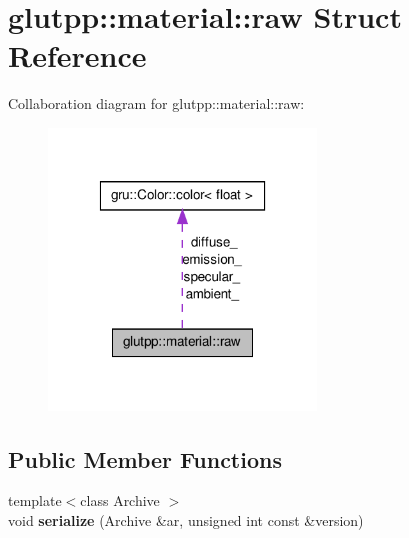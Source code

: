 \hypertarget{structglutpp_1_1material_1_1raw}{\section{glutpp\-:\-:material\-:\-:raw \-Struct \-Reference}
\label{structglutpp_1_1material_1_1raw}
}


\-Collaboration diagram for glutpp\-:\-:material\-:\-:raw\-:\nopagebreak
\begin{figure}[H]
\begin{center}
\leavevmode
\includegraphics[width=202pt]{structglutpp_1_1material_1_1raw__coll__graph}
\end{center}
\end{figure}
\subsection*{\-Public \-Member \-Functions}
\begin{DoxyCompactItemize}
\item 
\hypertarget{structglutpp_1_1material_1_1raw_a3062e16f1da2217db62fa54b30f2d2e2}{{\footnotesize template$<$class Archive $>$ }\\void {\bfseries serialize} (\-Archive \&ar, unsigned int const \&version)}\label{structglutpp_1_1material_1_1raw_a3062e16f1da2217db62fa54b30f2d2e2}

\end{DoxyCompactItemize}
